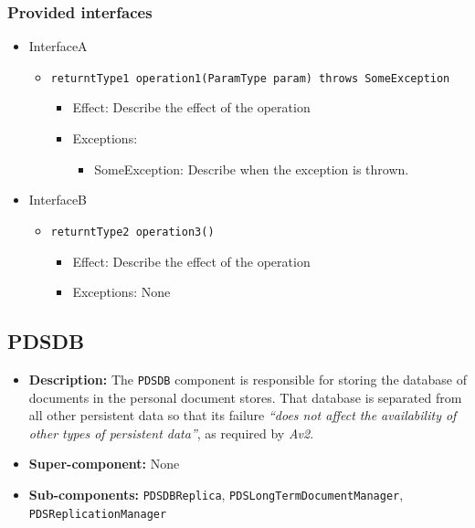 \documentclass[a4paper,10pt]{article}
\begin{document}
\subsubsection*{Provided interfaces}
\begin{itemize}
    \item InterfaceA
    \begin{itemize}
        \item \texttt{returntType1 operation1(ParamType param) throws SomeException}
        \begin{itemize}
            \item Effect: Describe the effect of the operation
            \item Exceptions:
            \begin{itemize}
                \item SomeException: Describe when the exception is thrown.
            \end{itemize}
        \end{itemize}
    \end{itemize}

    \item InterfaceB
    \begin{itemize}
        \item \texttt{returntType2 operation3()}
        \begin{itemize}
            \item Effect: Describe the effect of the operation
            \item Exceptions: None
        \end{itemize}
    \end{itemize}
\end{itemize}

\subsection{PDSDB}
\begin{itemize}
    \item \textbf{Description:} The \texttt{PDSDB} component is responsible for storing the database of documents in the personal document stores.  That database is separated from all other persistent data so that its failure \emph{``does not affect the availability of other types of persistent data''}, as required by \emph{Av2}.
    \item \textbf{Super-component:} None
    \item \textbf{Sub-components:} \texttt{PDSDBReplica}, \texttt{PDSLongTermDocumentManager}, \texttt{PDSReplicationManager}
\end{itemize}
\end{document}
